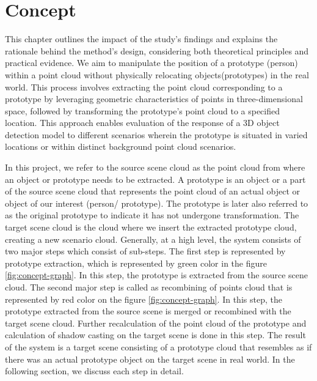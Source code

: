 \chapter{Concept}

This chapter outlines the impact of the study's findings and explains the rationale behind the method's design, considering both theoretical principles and practical evidence. 
We aim to manipulate the position of a prototype (person) within a point cloud without physically relocating objects(prototypes) in the real world. This process involves extracting the point cloud corresponding to a prototype by leveraging geometric characteristics of points in three-dimensional space, followed by transforming the prototype's point cloud to a specified location. This approach enables evaluation of the response of a 3D object detection model to different scenarios wherein the prototype is situated in varied locations or within distinct background point cloud scenarios.

In this project, we refer to the source scene cloud as the point cloud from where an object or prototype needs to be extracted. A prototype is an object or a part of the source scene cloud that represents the point cloud of an actual object or object of our interest (person/ prototype). The prototype is later also referred to as the original prototype to indicate it has not undergone transformation. The target scene cloud is the cloud where we insert the extracted prototype cloud, creating a new scenario cloud. Generally, at a high level, the system consists of two major steps which consist of sub-steps. The first step is represented by prototype extraction, which is represented by green color in the figure \ref{fig:concept-graph}. In this step, the prototype is extracted from the source scene cloud. The second major step is called as recombining of points cloud that is represented by red color on the figure \ref{fig:concept-graph}. In this step, the prototype extracted from the source scene is merged or recombined with the target scene cloud. Further recalculation of the point cloud of the prototype and calculation of shadow casting on the target scene is done in this step. The result of the system is a target scene consisting of a prototype cloud that resembles as if there was an actual prototype object on the target scene in real world. In the following section, we discuss each step in detail.

